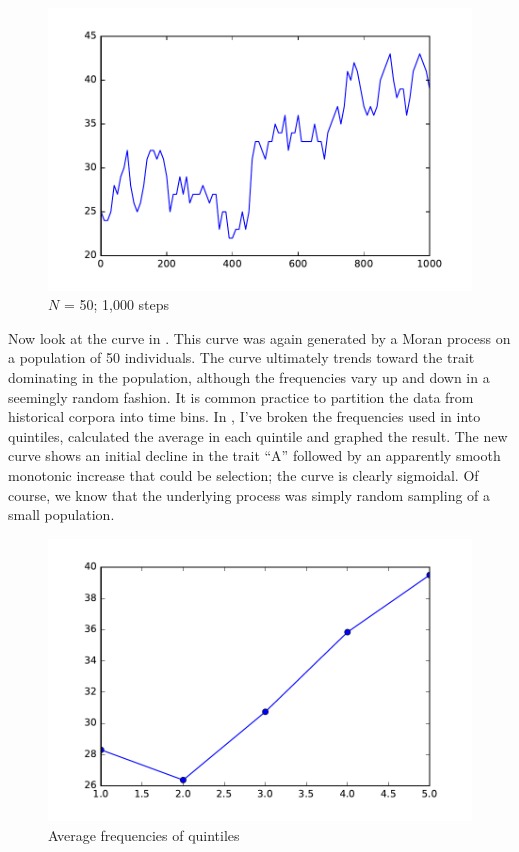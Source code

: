 \documentclass[output=paper]{langsci/langscibook}
\begin{document}
\begin{figure}[ht]
  \centering
  \includegraphics[width=.8\linewidth]{./img/jaggedy.pdf}
  \caption{$N$ = 50; 1,000 steps}
  \label{jaggedy}
\end{figure}

Now look at the curve in .  This curve was again
generated by a Moran process on a population of 50 individuals.  The
curve ultimately trends toward the trait dominating in the population,
although the frequencies vary up and down in a seemingly random
fashion.  It is common practice to partition the data from historical
corpora into time bins.  In , I've broken the
frequencies used in  into quintiles, calculated
the average in each quintile and graphed the result.  The new curve
shows an initial decline in the trait ``A'' followed by an apparently
smooth monotonic increase that could be selection; the curve is
clearly sigmoidal.  Of course, we know that the underlying process was
simply random sampling of a small population.

\begin{figure}[ht]
  \centering
  \includegraphics[width=.8\linewidth]{./img/smooth_data.pdf}
  \caption{Average frequencies of quintiles}
  \label{smoothed}
\end{figure}
\end{document}
